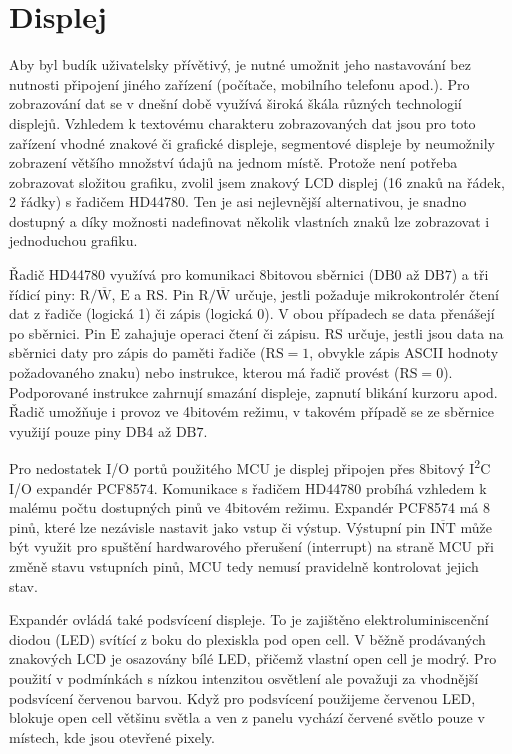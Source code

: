 \section{Displej}
Aby byl budík uživatelsky přívětivý, je nutné umožnit jeho nastavování bez
nutnosti připojení jiného zařízení (počítače, mobilního telefonu apod.).
Pro zobrazování dat se v dnešní době využívá široká škála různých technologií
displejů. Vzhledem k textovému charakteru zobrazovaných dat jsou pro toto
zařízení vhodné znakové či grafické displeje, segmentové displeje by neumožnily
zobrazení většího množství údajů na jednom místě. Protože není potřeba
zobrazovat složitou grafiku, zvolil jsem znakový LCD displej (16 znaků na
řádek, 2 řádky) s řadičem HD44780. Ten je asi nejlevnější alternativou, je
snadno dostupný a díky možnosti nadefinovat několik vlastních znaků lze
zobrazovat i jednoduchou grafiku.

Řadič HD44780 využívá pro komunikaci 8bitovou sběrnici ($\mathrm{DB0}$ až
$\mathrm{DB7}$) a tři řídicí piny: $\mathrm{R}/\overline{\mathrm{W}}$,
$\mathrm{E}$ a $\mathrm{RS}$. Pin $\mathrm{R}/\overline{\mathrm{W}}$ určuje,
jestli požaduje mikrokontrolér čtení dat z řadiče (logická 1) či zápis (logická
0). V obou případech se data přenášejí po sběrnici. Pin $\mathrm{E}$ zahajuje
operaci čtení či zápisu. $\mathrm{RS}$ určuje, jestli jsou data na sběrnici
daty pro zápis do paměti řadiče ($\mathrm{RS} = 1$, obvykle zápis ASCII hodnoty
požadovaného znaku) nebo instrukce, kterou má řadič provést ($\mathrm{RS} =
0$). Podporované instrukce zahrnují smazání displeje, zapnutí blikání kurzoru
apod. Řadič umožňuje i provoz ve 4bitovém režimu, v takovém případě se ze
sběrnice využijí pouze piny $\mathrm{DB4}$ až $\mathrm{DB7}$.~\cite{dshHD44780}

Pro nedostatek I/O portů použitého MCU je displej připojen přes
8bitový I\textsuperscript{2}C I/O expandér PCF8574. Komunikace s řadičem
HD44780 probíhá vzhledem k malému počtu dostupných pinů ve 4bitovém režimu.
Expandér PCF8574 má 8 pinů, které lze nezávisle nastavit jako vstup či výstup.
Výstupní pin $\overline{\mathrm{INT}}$ může být využit pro spuštění
hardwarového přerušení (interrupt) na straně MCU při změně stavu vstupních
pinů, MCU tedy nemusí pravidelně kontrolovat jejich stav.~\cite{dshPCF8574}


Expandér ovládá také podsvícení displeje. To je zajištěno elektroluminiscenční
diodou (LED) svítící z boku do plexiskla pod open cell. V běžně prodávaných
znakových LCD je osazovány bílé LED, přičemž vlastní open cell je modrý. Pro
použití v podmínkách s nízkou intenzitou osvětlení ale považuji za vhodnější
podsvícení červenou barvou. Když pro podsvícení použijeme červenou LED, blokuje
open cell většinu světla a ven z panelu vychází červené světlo pouze v místech,
kde jsou otevřené pixely.

